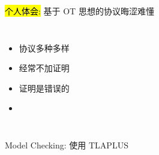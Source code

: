 
\begin{frame}{}
  \centerline{\large \hl{个人体会:} 基于 OT 思想的协议晦涩难懂}

  \vspace{0.60cm}
  \begin{columns}
      \pause
      \begin{itemize}
	\setlength{\itemsep}{10pt}
	\centering
	\item 协议多种多样
	\item 经常不加证明
	\item 证明是错误的
	\item<3-> \hl{}
      \end{itemize}
  \end{columns}
\end{frame}

\begin{frame}{}
  \begin{center}
    {\large 
      Model Checking: 使用 TLAPLUS \\[5pt]
      \href{https://github.com/Disalg-ICS-NJU/tlaplus-lamport-projects/tree/master/tlaplus-projects/Hengfeng-Wei/Wei-jupiter-tla}{}
    }
  \end{center}

  \begin{columns}
      \vspace{-0.50cm}
    \pause
  \end{columns}
\end{frame}

